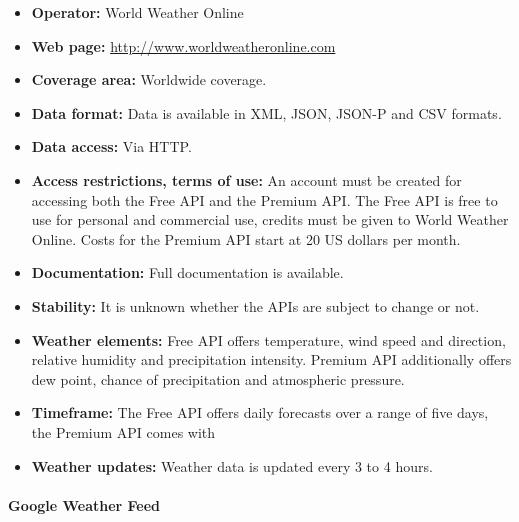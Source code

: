 \begin{itemize}
  \item \textbf{Operator:} World Weather Online
  \item \textbf{Web page:} \href{http://www.worldweatheronline.com}{http://www.worldweatheronline.com}
  \item \textbf{Coverage area:} Worldwide coverage.
  \item \textbf{Data format:} Data is available in XML, JSON, JSON-P and CSV formats.
  \item \textbf{Data access:} Via HTTP.
  \item \textbf{Access restrictions, terms of use:} An account must be created for accessing both the Free API and the Premium API. The Free API is free to use for personal and commercial use, credits must be given to World Weather Online. Costs for the Premium API start at 20 US dollars per month.
  \item \textbf{Documentation:} Full documentation is available.
  \item \textbf{Stability:} It is unknown whether the APIs are subject to change or not.
  \item \textbf{Weather elements:} Free API offers temperature, wind speed and direction, relative humidity and precipitation intensity. Premium API additionally offers dew point, chance of precipitation and atmospheric pressure.
  \item \textbf{Timeframe:} The Free API offers daily forecasts over a range of five days, the Premium API comes with %
  \item \textbf{Weather updates:} Weather data is updated every 3 to 4 hours.
\end{itemize}

\paragraph{Google Weather Feed}

